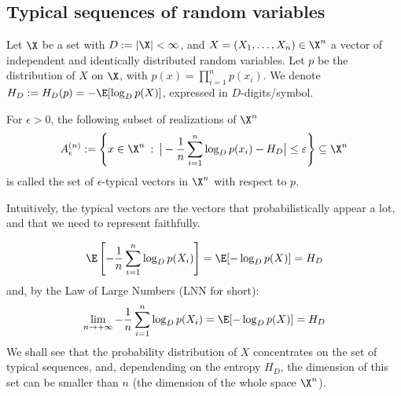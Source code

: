 \documentclass[toc, titlepaged]{../cs-classes/cs-classes}
\begin{document}
\subsection{Typical sequences of random variables}
\begin{definition}
    Let $\X$ be a set with $D:=|\X|<\infty$, and $X=(X_1, \dots, X_n)\in \X^n$ a vector of independent and identically distributed random variables. Let $p$ be the distribution of $X$ on $\X$, with $p(x)=\prod_{i=1}^n p(x_i)$. We denote $H_D:=H_D(p)=-\E[\log_Dp(X)]$, expressed in $D$-digits/symbol.

    For $\epsilon>0$, the following subset of realizations of $\X^n$
    \begin{equation}
        A_\epsilon^{(n)}:=\left\{x\in \X^n \: : \: \big| -\frac{1}{n}\sum_{i=1}^n \log_Dp(x_i)-H_D\big|\leq \varepsilon\right\}\subseteq \X^n
    \end{equation}
    is called the set of $\epsilon$-typical vectors in $\X^n$ with respect to $p$.

    Intuitively, the typical vectors are the vectors that probabilistically appear a lot, and that we need to represent faithfully.
\end{definition}

\begin{remark}
    \begin{equation*}
        \E\left[-\frac{1}{n}\sum_{i=1}^n \log_Dp(X_i)\right] = \E[-\log_Dp(X)]=H_D
    \end{equation*}
    and, by the Law of Large Numbers (LNN for short):
    \begin{equation*}
        \lim_{n\to+\infty}-\frac{1}{n}\sum_{i=1}^n \log_Dp(X_i) = \E[-\log_D p(X)] = H_D
    \end{equation*}
    We shall see that the probability distribution of $X$ concentrates on the set of typical sequences, and, dependending on the entropy $H_D$, the dimension of this set can be smaller than $n$ (the dimension of the whole space $\X^n$).
\end{remark}
\end{document}
